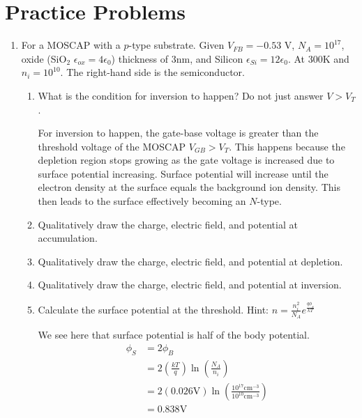 \section{Practice Problems}

\begin{enumerate}
    \item For a MOSCAP with a $p$-type substrate. Given $V_{FB} = -0.53$ V, $N_A = 10^{17}$\conc, oxide (SiO$_2$ $\epsilon_{ox} = 4\epsilon_0$) thickness of 3nm, and Silicon $\epsilon_{Si} = 12\epsilon_0$. At 300K and $n_i = 10^{10}$\conc. The right-hand side is the semiconductor.
    \begin{enumerate}
        \item What is the condition for inversion to happen? Do not just answer $V > V_T$.
        \begin{Ans}
            For inversion to happen, the gate-base voltage is greater than the threshold voltage of the MOSCAP $V_{GB} > V_T$. This happens because the depletion region stops growing as the gate voltage is increased due to surface potential increasing. Surface potential will increase until the electron density at the surface equals the background ion density. This then leads to the surface effectively becoming an $N$-type.
        \end{Ans}

        \item Qualitatively draw the charge, electric field, and potential at accumulation.
        \item Qualitatively draw the charge, electric field, and potential at depletion.
        \item Qualitatively draw the charge, electric field, and potential at inversion.
        \item Calculate the surface potential at the threshold. Hint: {\large $n = \frac{n_i^2}{N_A} e^{\frac{q\phi_s}{kT}}$}
        \begin{Ans}
            We see here that surface potential is half of the body potential.
            \begin{align*}
                \phi_S &= 2\phi_B \\
                &= 2(\frac{kT}{q}) \ln(\frac{N_A}{n_i}) \\
                &= 2(0.026 \mathrm{V}) \ln(\frac{10^{17} \mathrm{cm}^{-3}}{10^{10} \mathrm{cm}^{-3}}) \\
                &= 0.838 \mathrm{V}
            \end{align*}
        \end{Ans}


\end{enumerate}
\end{enumerate}

